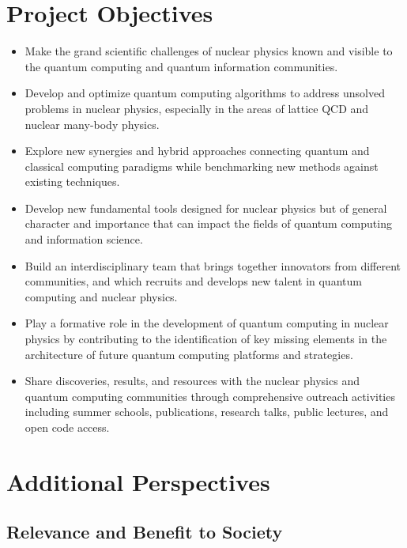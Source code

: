 \documentclass[11pt]{article}
\begin{document}
\section{Project Objectives}
\begin{itemize}

\item Make the grand scientific challenges of nuclear physics known and visible to the quantum computing and quantum information communities.

\item  Develop and optimize quantum computing algorithms to address unsolved problems in nuclear physics, especially in the areas of lattice QCD and nuclear many-body physics.

\item  Explore new synergies and hybrid approaches connecting quantum and classical computing paradigms while benchmarking new methods against existing techniques.

\item Develop new fundamental tools designed for nuclear physics but of general character and importance that can impact the fields of quantum computing and information science.

\item  Build an interdisciplinary team
that brings together innovators from different communities, and which recruits and develops new talent in quantum computing and nuclear physics.

\item  Play a formative role in the development of quantum computing in nuclear physics by contributing to the identification of key missing elements in the architecture of future quantum computing platforms and strategies.

\item  Share discoveries, results, and resources with the nuclear physics and quantum computing communities
through comprehensive outreach activities including summer schools, publications, research talks, public lectures, and open code access.
\end{itemize}

\section{Additional Perspectives}

\subsection{Relevance and Benefit to Society}
\end{document}
